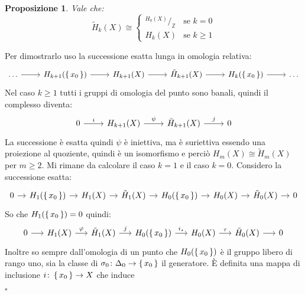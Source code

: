 \documentclass[10pt, twoside=false, x11names]{scrbook}
\newtheorem{proposition}[theorem]{Proposizione}
\newenvironment{proof}{{\textbf{Dimostrazione}:}}{\hfill $\square$}
\newcommand{\Z}{\mathbb{Z}}
\newcommand{\im}[1]{\mathrm{Im}( #1 )}
\renewcommand{\ker}[1]{\mathrm{Ker}( #1)}
\newcommand*\quot[2]{{^{\textstyle #1}\big/_{\textstyle #2}}}
\let\phi\varphi
\begin{document}
\begin{proposition}
  Vale che:
  \[
    \tilde{H}_k(X) \cong
    \begin{cases}
      \quot{H_0(X)}{\Z} & \text{se } k = 0 \\
      H_k(X) & \text{se } k \geq 1
    \end{cases}
  \]
\end{proposition}
\begin{proof}
  Per dimostrarlo uso la successione esatta lunga in omologia relativa:
  \[
    \begin{tikzcd}
      \dots \arrow{r}{} & H_{k+1}(\set{x_0}) \arrow{r}{} & H_{k+1}(X) \arrow{r}{} & \tilde{H}_{k+1}(X) \arrow{r}{} & H_k(\set{x_0}) \arrow{r}{} & \dots
    \end{tikzcd}
  \]
  Nel caso $ k \geq 1 $ tutti i gruppi di omologia del punto sono banali, quindi il complesso diventa:
  \[
    \begin{tikzcd}
      0 \arrow{r}{i} & H_{k+1}(X) \arrow{r}{\psi} &  \tilde{H}_{k+1}(X) \arrow{r}{j} &  0
    \end{tikzcd}
  \]
  La successione è esatta quindi $ \psi $ è iniettiva, ma è suriettiva essendo una
  proiezione al quoziente, quindi è un isomorfismo e perciò $ H_m(X) \cong \tilde{H}_m(X) $ per $ m \geq 2 $.
  Mi rimane da calcolare il caso $ k = 1 $ e il caso $ k = 0 $.
  Considero la successione esatta:
  \[
    \begin{tikzcd}[nodes = {column sep = 10pt}]
      0 \rar & H_1(\set{x_0}) \rar & H_1(X) \rar & \tilde{H}_1(X) \rar & H_0(\set{x_0}) \rar & H_0(X) \rar & \tilde{H}_0(X) \rar & 0
    \end{tikzcd}
  \]
  So che $ H_1(\set{x_0}) = 0 $ quindi:
  \[
    \begin{tikzcd}[nodes = {column sep = 15pt}]
      0 \rar & H_1(X) \rar{\phi} & \tilde{H}_1(X) \rar{j} & H_0(\set{x_0}) \rar{i_\star} & H_0(X) \rar{\tau} & \tilde{H}_0(X) \rar & 0
    \end{tikzcd}
  \]
  Inoltre so sempre dall'omologia di un punto che $ H_0(\set{x_0}) $ è il gruppo libero di rango
  uno, sia la classe di $ \sigma_0 \colon \Delta_0 \to \set{x_0} $ il generatore. È definita una
  mappa di inclusione $ i \colon \set{x_0} \to X $ che induce

\end{proof}
\end{document}

